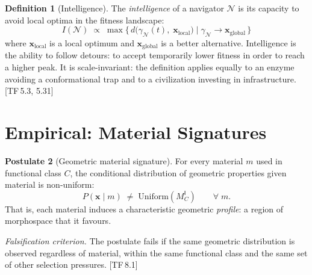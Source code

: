 \documentclass[10pt]{article}
\theoremstyle{definition}
\newtheorem{definition}{Definition}[section]
\newtheorem{postulate}[definition]{Postulate}
\theoremstyle{plain}
\theoremstyle{remark}
\newcommand{\MC}{M^{\mathsf{I}}_C}          %
\newcommand{\Nav}{\mathcal{N}}               %
\newcommand{\TF}[1]{\textnormal{[TF\,#1]}}  %
\begin{document}
\begin{definition}[Intelligence]\label{def:5.3}
The \emph{intelligence} of a navigator $\Nav$ is its capacity to avoid
local optima in the fitness landscape:
\[
  I(\Nav) \;\propto\;
  \max\bigl\{\, d\bigl(\gamma_\Nav(t),\;
    \bm{x}_{\mathrm{local}}\bigr)
    \;\big|\;
    \gamma_\Nav \to \bm{x}_{\mathrm{global}}
  \,\bigr\}
\]
where $\bm{x}_{\mathrm{local}}$ is a local optimum and
$\bm{x}_{\mathrm{global}}$ is a better alternative.
Intelligence is the ability to follow detours: to accept temporarily
lower fitness in order to reach a higher peak. It is scale-invariant:
the definition applies equally to an enzyme avoiding a conformational
trap and to a civilization investing in infrastructure. \TF{5.3, 5.31}
\end{definition}


\newpage
\section{Empirical: Material Signatures}\label{sec:empirical}

\begin{postulate}[Geometric material signature]\label{post:6.1}
For every material $m$ used in functional class $C$, the conditional
distribution of geometric properties given material is non-uniform:
\[
  P(\bm{x} \mid m) \;\neq\; \mathrm{Uniform}(\MC)
  \qquad \forall\; m.
\]
That is, each material induces a characteristic geometric \emph{profile}:
a region of morphospace that it favours.

\medskip\noindent
\textit{Falsification criterion.}
The postulate fails if the same geometric distribution is observed
regardless of material, within the same functional class and the same
set of other selection pressures. \TF{8.1}
\end{postulate}
\end{document}
